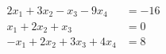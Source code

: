 %
\begin{align*}
2x_1+ 3x_2-x_3 -9x_4&=-16\\
x_1+ 2x_2+ x_3&=0\\
-x_1+ 2x_2+ 3x_3+ 4x_4&=8
\end{align*}
